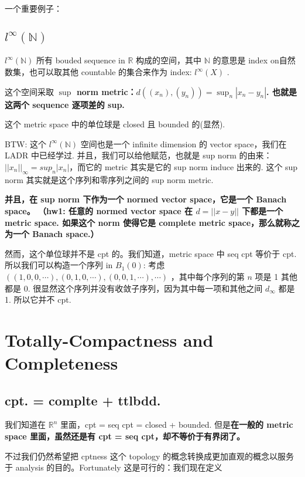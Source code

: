 \documentclass[lang=cn,11pt]{elegantbook}
\begin{document}
一个重要例子：
\subsection{$l^{\infty}(\mathbb{N})$}

\begin{definition}{$l^{\infty}(\mathbb{N})$} \label{linfinity}
    所有 bouded sequence in $\mathbb{R}$ 构成的空间，其中 $\mathbb{N}$ 的意思是 index on自然数集，也可以取其他 countable 的集合来作为 index: $l^{\infty}(X)$ .
\end{definition}


这个空间采取\textbf{ $\sup$ norm metric：$d((x_n), (y_n)) = \sup_{n} |x_n - y_n| $. 也就是这两个 sequence 逐项差的 sup.}

这个 metric space 中的单位球是 closed 且 bounded 的(显然).  

BTW: 这个 $l^{\infty}(\mathbb{N})$ 空间也是一个 infinite dimension 的 vector space，我们在 LADR 中已经学过. 并且，我们可以给他赋范，也就是 sup norm 的由来：\textbf{$||x_n||_{\infty} = sup_{n}|x_n|$}，而它的 metric 其实是它的 sup norm induce 出来的. 这个 sup norm 其实就是这个序列和零序列之间的 sup norm metric. 

\textbf{并且，在 sup norm 下作为一个 normed vector space，它是一个 Banach space。
（hw1: 任意的 normed vector space 在 $d =  ||x-y||$ 下都是一个 metric space. 如果这个 norm 使得它是 complete metric space，那么就称之为一个 Banach space.）}

然而，这个单位球并不是 cpt 的。我们知道，metric space 中 seq cpt 等价于 cpt. 所以我们可以构造一个序列 in $B_1(0)$: 考虑 $((1,0,0,\cdots), (0,1,0,\cdots),(0,0,1,\cdots),\cdots)$ ，其中每个序列的第 $n$ 项是 1 其他都是 0. 很显然这个序列并没有收敛子序列，因为其中每一项和其他之间 $d_{\infty}$ 都是1. 所以它并不 cpt.


\section{Totally-Compactness and Completeness}
\subsection{cpt. = complte + ttlbdd.}
我们知道在 $\mathbb{R}^n$ 里面，cpt = seq cpt = closed + bounded.
但是\textbf{在一般的 metric space 里面，虽然还是有 cpt = seq cpt，却不等价于有界闭了。}

不过我们仍然希望把 cptness 这个 topology 的概念转换成更加直观的概念以服务于 analysis 的目的。Fortunately 这是可行的：我们现在定义
\end{document}
